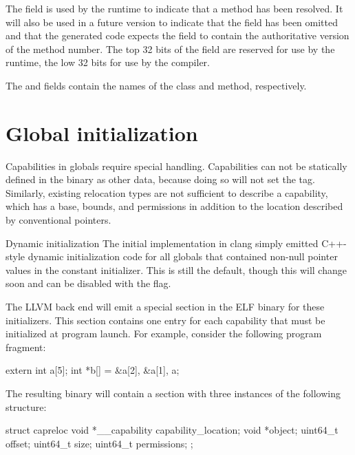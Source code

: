 The  field is used by the runtime to indicate that a method has been resolved.
It will also be used in a future version to indicate that the  field has been omitted and that the generated code expects the  field to contain the authoritative version of the method number.
The top 32 bits of the  field are reserved for use by the runtime, the low 32 bits for use by the compiler.

The  and  fields contain the names of the class and method, respectively.

\section{Global initialization}

Capabilities in globals require special handling.
Capabilities can not be statically defined in the binary as other data, because doing so will not set the tag.
Similarly, existing relocation types are not sufficient to describe a capability, which has a base, bounds, and permissions in addition to the location described by conventional pointers.

\begin{notebox}{Dynamic initialization}
The initial implementation in clang simply emitted C++-style dynamic initialization code for all globals that contained non-null pointer values in the constant initializer.
This is still the default, though this will change soon and can be disabled with the  flag.
\end{notebox}

The LLVM back end will emit a special section in the ELF binary for these initializers.
This section contains one entry for each capability that must be initialized at program launch.
For example, consider the following program fragment:
\begin{csnippet}
extern int a[5];
int *b[] = {&a[2], &a[1], a};
\end{csnippet}

The resulting binary will contain a  section with three instances of the following structure:

\begin{csnippet}
struct capreloc
{
	void *__capability capability_location;
	void              *object;
	uint64_t           offset;
	uint64_t           size;
	uint64_t           permissions;
};
\end{csnippet}


